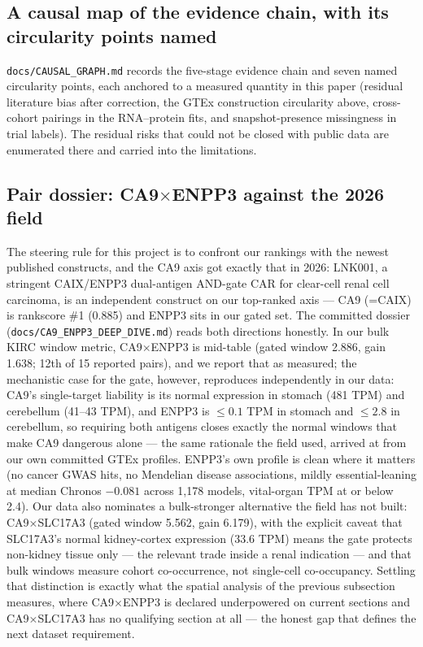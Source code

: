 \documentclass[11pt]{article}
\begin{document}
\subsection{A causal map of the evidence chain, with its circularity points named}
\texttt{docs/CAUSAL\_GRAPH.md} records the five-stage evidence chain and
seven named circularity points, each anchored to a measured quantity in this
paper (residual literature bias after correction, the GTEx construction
circularity above, cross-cohort pairings in the RNA--protein fits, and
snapshot-presence missingness in trial labels). The residual risks that could
not be closed with public data are enumerated there and carried into the
limitations.

\subsection{Pair dossier: CA9$\times$ENPP3 against the 2026 field}
The steering rule for this project is to confront our rankings with the newest
published constructs, and the CA9 axis got exactly that in 2026: LNK001, a
stringent CAIX/ENPP3 dual-antigen AND-gate CAR for clear-cell renal cell
carcinoma, is an independent construct on our top-ranked axis --- CA9 (=CAIX)
is rankscore \#1 (0.885) and ENPP3 sits in our gated set. The committed
dossier (\texttt{docs/CA9\_ENPP3\_DEEP\_DIVE.md}) reads both directions
honestly. In our bulk KIRC window metric, CA9$\times$ENPP3 is mid-table
(gated window 2.886, gain 1.638; 12th of 15 reported pairs), and we report
that as measured; the mechanistic case for the gate, however, reproduces
independently in our data: CA9's single-target liability is its normal
expression in stomach (481 TPM) and cerebellum (41--43 TPM), and ENPP3 is
$\le 0.1$ TPM in stomach and $\le 2.8$ in cerebellum, so requiring both
antigens closes exactly the normal windows that make CA9 dangerous alone ---
the same rationale the field used, arrived at from our own committed GTEx
profiles. ENPP3's own profile is clean where it matters (no cancer GWAS hits,
no Mendelian disease associations, mildly essential-leaning at median Chronos
$-0.081$ across 1{,}178 models, vital-organ TPM at or below 2.4). Our data also
nominates a bulk-stronger alternative the field has not built: CA9$\times$SLC17A3
(gated window 5.562, gain 6.179), with the explicit caveat that SLC17A3's
normal kidney-cortex expression (33.6 TPM) means the gate protects non-kidney
tissue only --- the relevant trade inside a renal indication --- and that bulk
windows measure cohort co-occurrence, not single-cell co-occupancy. Settling
that distinction is exactly what the spatial analysis of the previous
subsection measures, where CA9$\times$ENPP3 is declared underpowered on
current sections and CA9$\times$SLC17A3 has no qualifying section at all ---
the honest gap that defines the next dataset requirement.
\end{document}
